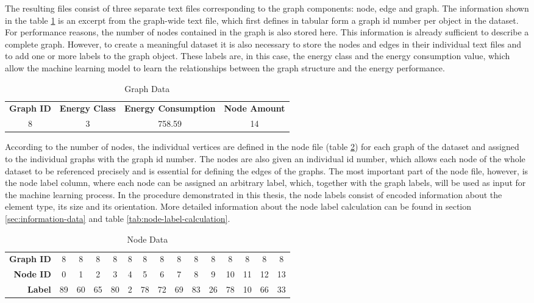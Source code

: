 \documentclass[a4paper, 12pt]{report}
\begin{document}
The resulting files consist of three separate text files corresponding to the graph components: node, edge and graph. The information shown in the table \ref{tab:graph-data} is an excerpt from the graph-wide text file, which first defines in tabular form a graph \acrlong{id} number per object in the dataset. For performance reasons, the number of nodes contained in the graph is also stored here. This information is already sufficient to describe a complete graph. However, to create a meaningful dataset it is also necessary to store the nodes and edges in their individual text files and to add one or more labels to the graph object. These labels are, in this case, the energy class and the energy consumption value, which allow the machine learning model to learn the relationships between the graph structure and the energy performance.

\begin{table}
\centering
\begin{tabular}{ cccc }
\textbf{Graph ID} & \textbf{Energy Class} & \textbf{Energy Consumption} & \textbf{Node Amount} \\
8 & 3 & 758.59 & 14 \\
\end{tabular}
\caption{Graph Data}
\label{tab:graph-data}
\end{table}

According to the number of nodes, the individual vertices are defined in the node file (table \ref{tab:node-data}) for each graph of the dataset and assigned to the individual graphs with the graph \acrlong{id} number. The nodes are also given an individual \acrlong{id} number, which allows each node of the whole dataset to be referenced precisely and is essential for defining the edges of the graphs. The most important part of the node file, however, is the node label column, where each node can be assigned an arbitrary label, which, together with the graph labels, will be used as input for the machine learning process. In the procedure demonstrated in this thesis, the node labels consist of encoded information about the element type, its size and its orientation. More detailed information about the node label calculation can be found in section \ref{sec:information-data} and table \ref{tab:node-label-calculation}.

\begin{table}
\centering
\begin{tabular}{ rcccccccccccccc }
\textbf{Graph ID} & 8 & 8 & 8 & 8 & 8 & 8 & 8 & 8 & 8 & 8 & 8 & 8 & 8 & 8 \\
\textbf{Node ID} & 0 & 1 & 2 & 3 & 4 & 5 & 6 & 7 & 8 & 9 & 10 & 11 & 12 & 13 \\
\textbf{Label} & 89 & 60 & 65 & 80 & 2 & 78 & 72 & 69 & 83 & 26 & 78 & 10 & 66 & 33 \\
\end{tabular}
\caption{Node Data}
\label{tab:node-data}
\end{table}
\end{document}
